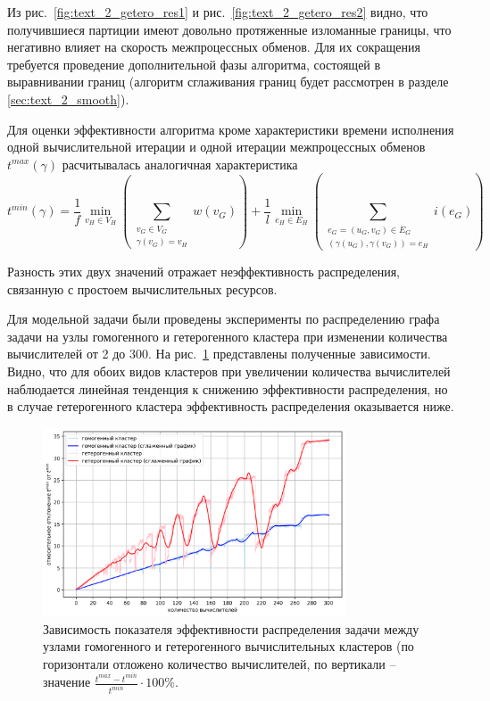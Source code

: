 Из рис.~\ref{fig:text_2_getero_res1} и рис.~\ref{fig:text_2_getero_res2} видно, что получившиеся партиции имеют довольно протяженные изломанные границы, что негативно влияет на скорость межпроцессных обменов.
Для их сокращения требуется проведение дополнительной фазы алгоритма, состоящей в выравнивании границ (алгоритм сглаживания границ будет рассмотрен в разделе \ref{sec:text_2_smooth}).

Для оценки эффективности алгоритма кроме характеристики времени исполнения одной вычислительной итерации и одной итерации межпроцессных обменов $t^{max}(\gamma)$ расчитывалась аналогичная характеристика
\begin{equation}
	t^{min}(\gamma) =
		\frac{1}{f} \min_{v_H \in V_H}{\left( \sum_{\substack{v_G \in V_G \\ \gamma(v_G) = v_H}}{w(v_G)} \right)} + 
		\frac{1}{l} \min_{e_H \in E_H}{\left( \sum_{\substack{e_G = (u_G, v_G) \in E_G \\ (\gamma(u_G), \gamma(v_G)) = e_H}}{i(e_G)} \right)}
\end{equation}

Разность этих двух значений отражает неэффективность распределения, связанную с простоем вычислительных ресурсов.

Для модельной задачи были проведены эксперименты по распределению графа задачи на узлы гомогенного и гетерогенного кластера при изменении количества вычислителей от 2 до 300.
На рис.~\ref{fig:text_2_getero_chart} представлены полученные зависимости.
Видно, что для обоих видов кластеров при увеличении количества вычислителей наблюдается линейная тенденция к снижению эффективности распределения, но в случае гетерогенного кластера эффективность распределения оказывается ниже.

\begin{figure}[H]
\centering
\includegraphics[width=0.8\textwidth]{./pics/text_2_getero/chart2.png}
\singlespacing
{}\caption{Зависимость показателя эффективности распределения задачи между узлами гомогенного и гетерогенного вычислительных кластеров (по горизонтали отложено количество вычислителей, по вертикали -- значение $\frac{t^{max} - t^{min}}{t^{min}} \cdot 100\%$.}
\label{fig:text_2_getero_chart}
\end{figure}
